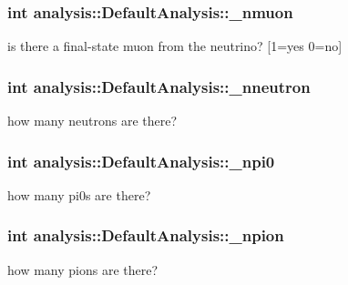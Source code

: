 \subsubsection[{\texorpdfstring{\+\_\+nmuon}{_nmuon}}]{\setlength{\rightskip}{0pt plus 5cm}int analysis\+::\+Default\+Analysis\+::\+\_\+nmuon\hspace{0.3cm}{\ttfamily [private]}}\hypertarget{classanalysis_1_1DefaultAnalysis_a6adae9dc9394640a78756a1da65b2162}{}\label{classanalysis_1_1DefaultAnalysis_a6adae9dc9394640a78756a1da65b2162}
is there a final-\/state muon from the neutrino? \mbox{[}1=yes 0=no\mbox{]} 
\subsubsection[{\texorpdfstring{\+\_\+nneutron}{_nneutron}}]{\setlength{\rightskip}{0pt plus 5cm}int analysis\+::\+Default\+Analysis\+::\+\_\+nneutron\hspace{0.3cm}{\ttfamily [private]}}\hypertarget{classanalysis_1_1DefaultAnalysis_afb7f9e564492c71227112ce13f52ce9c}{}\label{classanalysis_1_1DefaultAnalysis_afb7f9e564492c71227112ce13f52ce9c}
how many neutrons are there? 
\subsubsection[{\texorpdfstring{\+\_\+npi0}{_npi0}}]{\setlength{\rightskip}{0pt plus 5cm}int analysis\+::\+Default\+Analysis\+::\+\_\+npi0\hspace{0.3cm}{\ttfamily [private]}}\hypertarget{classanalysis_1_1DefaultAnalysis_ab6eca9a94c20a6fb7e127043f165ff9b}{}\label{classanalysis_1_1DefaultAnalysis_ab6eca9a94c20a6fb7e127043f165ff9b}
how many pi0s are there? 
\subsubsection[{\texorpdfstring{\+\_\+npion}{_npion}}]{\setlength{\rightskip}{0pt plus 5cm}int analysis\+::\+Default\+Analysis\+::\+\_\+npion\hspace{0.3cm}{\ttfamily [private]}}\hypertarget{classanalysis_1_1DefaultAnalysis_a39a918abd4b60bf475907f5778ba5e9a}{}\label{classanalysis_1_1DefaultAnalysis_a39a918abd4b60bf475907f5778ba5e9a}
how many pions are there? 
